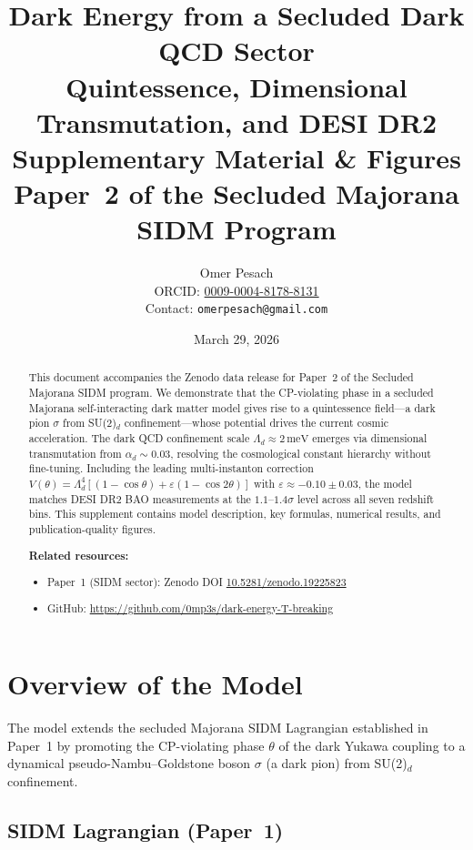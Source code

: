 \documentclass[11pt,a4paper]{article}
\title{\textbf{Dark Energy from a Secluded Dark QCD Sector}\\[4pt]
\Large Quintessence, Dimensional Transmutation, and DESI DR2\\[8pt]
\large Supplementary Material \& Figures\\[4pt]
\normalsize Paper~2 of the Secluded Majorana SIDM Program}
\author{Omer Pesach\\[2pt]
\small ORCID: \href{https://orcid.org/0009-0004-8178-8131}{0009-0004-8178-8131}\\[2pt]
\small Contact: \texttt{omerpesach@gmail.com}}
\date{March 29, 2026}
\newcommand{\Ld}{\Lambda_d}
\newcommand{\meV}{\,\mathrm{meV}}
\begin{document}
\maketitle
\thispagestyle{fancy}

\begin{abstract}
\noindent
This document accompanies the Zenodo data release for Paper~2 of the Secluded Majorana SIDM program.
We demonstrate that the CP-violating phase in a secluded Majorana self-interacting dark matter model
gives rise to a quintessence field---a dark pion $\sigma$ from SU(2)$_d$ confinement---whose
potential drives the current cosmic acceleration. The dark QCD confinement scale
$\Ld \approx 2\meV$ emerges via dimensional transmutation from $\alpha_d \sim 0.03$,
resolving the cosmological constant hierarchy without fine-tuning.
Including the leading multi-instanton correction
$V(\theta)=\Ld^4[(1-\cos\theta)+\varepsilon(1-\cos 2\theta)]$ with
$\varepsilon\approx -0.10\pm 0.03$, the model matches DESI DR2 BAO measurements
at the $1.1$--$1.4\sigma$ level across all seven redshift bins.
This supplement contains model description, key formulas, numerical results, and
publication-quality figures.

\medskip\noindent
\textbf{Related resources:}
\begin{itemize}[nosep]
  \item Paper~1 (SIDM sector): Zenodo DOI \href{https://doi.org/10.5281/zenodo.19225823}{10.5281/zenodo.19225823}
  \item GitHub: \url{https://github.com/0mp3s/dark-energy-T-breaking}
\end{itemize}
\end{abstract}

\tableofcontents
\newpage

\section{Overview of the Model}
\label{sec:model}

The model extends the secluded Majorana SIDM Lagrangian established in Paper~1
by promoting the CP-violating phase $\theta$ of the dark Yukawa coupling to a dynamical
pseudo-Nambu--Goldstone boson $\sigma$ (a dark pion) from SU(2)$_d$ confinement.

\subsection{SIDM Lagrangian (Paper~1)}
\end{document}
